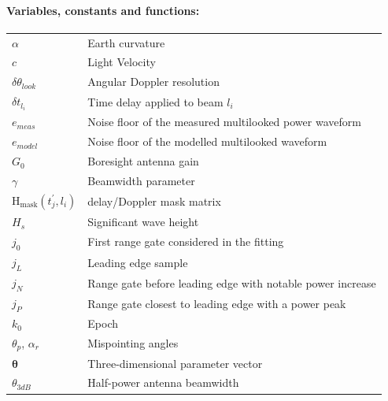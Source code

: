 \documentclass[11pt,a4paper]{article}
\begin{document}
\paragraph*{Variables, constants and functions:}
\begin{table}[ht!]
\hspace{-0.2cm}\begin{tabular}{m{}m{}}

$\alpha$ & Earth curvature \\

$c$ & Light Velocity \\

$\delta\theta_{look}$ & Angular Doppler resolution \\

$\delta t_{l_i}$ & Time delay applied to beam $l_i$ \\

$e_{meas}$ & Noise floor of the measured multilooked power waveform \\

$e_{model}$ & Noise floor of the modelled multilooked waveform \\

$G_0$ & Boresight antenna gain \\

$\gamma$ & Beamwidth parameter \\

$\text{H}_\text{mask}(t_j^\prime, l_i)$ & delay/Doppler mask matrix \\

$H_s$ & Significant wave height \\

$j_0$ & First range gate considered in the fitting \\

$j_L$ & Leading edge sample \\

$j_N$ & Range gate before leading edge with notable power increase \\

$j_P$ & Range gate closest to leading edge with a power peak \\

$k_0$ & Epoch \\

$\theta_p$, $\alpha_r$ & Mispointing angles \\ 

$\bm{\theta}$ & Three-dimensional parameter vector \\

$\theta_{3dB}$ & Half-power antenna beamwidth \\




\end{tabular}
\end{table}
\end{document}
